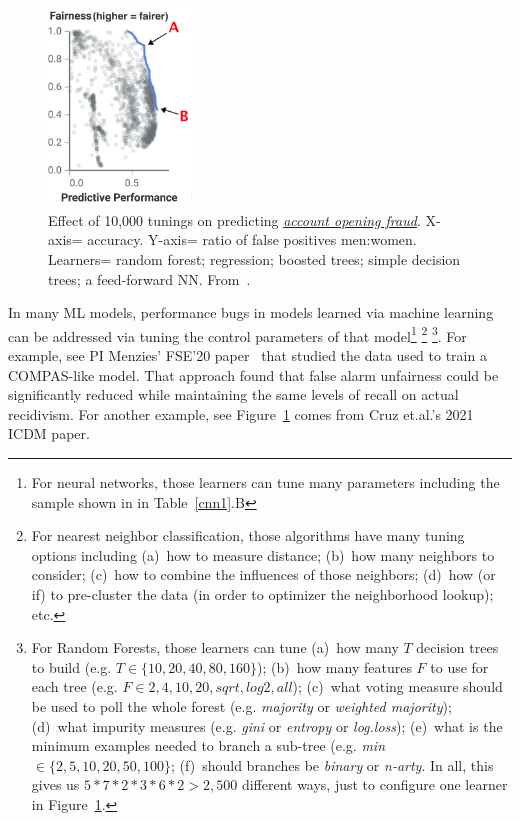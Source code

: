  
\begin{figure}
\centerline{\includegraphics[width=1.5in]{fig/aof.png}}
\caption{Effect of 10,000   tunings
on predicting \underline{\em account opening fraud}.
X-axis= accuracy.
Y-axis= ratio of false positives   men:women.
Learners=
random forest;   regression;   boosted trees; simple decision trees;  a feed-forward NN.
From~\cite{F_Cruz_2021}.}\label{one}\end{figure}
In many ML models, performance bugs in models learned via machine learning can be addressed via tuning
the control parameters of that model\footnote{For neural networks, those learners can tune many parameters including the
sample shown in 
in Table~\ref{cnn1}.B}
\footnote{For nearest neighbor classification, those algorithms have many tuning options
including (a)~how   to measure
distance; (b)~how many neighbors to consider; (c)~how to combine the influences of those neighbors;
(d)~how (or if) to pre-cluster
the data (in order to optimizer the neighborhood lookup); etc.} 
\footnote{For Random Forests,   those   learners
can tune
(a)~how many $T$ decision trees to build (e.g. $T\in \{10,20,40,80,160\}$); (b)~how many features $F$
to use for each tree (e.g. $F \in{2,4,10,20,
\mathit{sqrt}, \mathit{log2}, \mathit{all}}$);
(c)~what voting measure should be used to poll the whole forest (e.g. {\em majority} or {\em weighted majority}); 
(d)~what impurity measures (e.g. {\em gini} or {\em entropy} or {\em log.loss}); (e)~what is the minimum examples needed to branch a sub-tree
(e.g. {\em min}$\in \{2,5,10,20,50,100\}$; (f)~should branches be {\em binary} or {\em n-arty}.
In all, this gives us
$5*7*2*3*6*2 > 2,500$ different ways, just to configure one   learner in Figure~\ref{one}. }.
For example, see PI Menzies' FSE'20 paper~\cite{Chakraborty_2020} that studied the data used to train a COMPAS-like model. That approach found that false alarm unfairness could be significantly reduced  while  maintaining the same levels of recall on actual recidivism.
 For another example, see 
Figure~\ref{one} comes from Cruz et.al.'s 2021 ICDM paper. 
